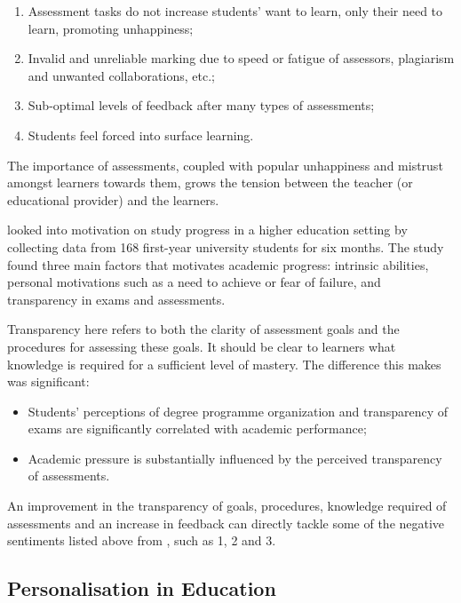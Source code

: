 \begin{enumerate}
    \setlength\itemsep{0em}
    \item Assessment tasks do not increase students' want to learn, only their need to learn, promoting unhappiness;
    \item Invalid and unreliable marking due to speed or fatigue of assessors, plagiarism and unwanted collaborations, etc.;
    \item Sub-optimal levels of feedback after many types of assessments;
    \item Students feel forced into surface learning.\\
    \citep[p.62-65]{brown1999assessment}
\end{enumerate}

The importance of assessments, coupled with popular unhappiness and mistrust amongst learners towards 
them, grows the tension between the teacher (or educational provider) and the learners.

\citet{suhre2013determinants} looked into motivation on study progress in a higher education setting by collecting data 
from 168 first-year university students for six months. The study found three main factors that motivates academic 
progress: intrinsic abilities, personal motivations such as a need to achieve or fear of failure, and transparency in 
exams and assessments.

Transparency here refers to both the clarity of assessment goals and the procedures for assessing these goals. 
It should be clear to learners what knowledge is required for a sufficient level of mastery. \citep{suhre2013determinants}
The difference this makes was significant:

\begin{itemize}
    \setlength\itemsep{0em}    
  \item Students' perceptions of degree programme organization and transparency of exams are 
  significantly correlated with academic performance;
  \item Academic pressure is substantially influenced by the perceived transparency of assessments.
\end{itemize}

An improvement in the transparency of goals, procedures, knowledge required of assessments and an increase 
in feedback can directly tackle some of the negative sentiments listed above from \citet{brown1999assessment}, 
such as 1, 2 and 3.

\subsection{Personalisation in Education}

